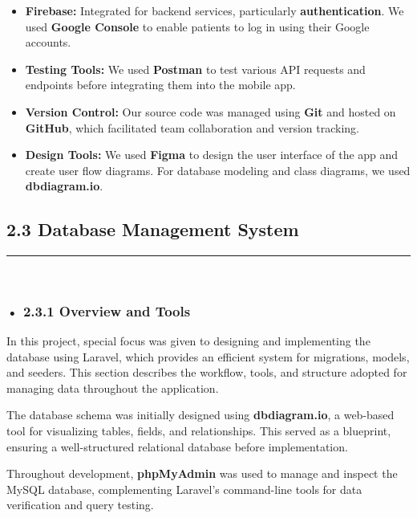 \documentclass[12pt]{report}
\begin{document}
\begin{itemize}
	\item \textbf{Firebase:} Integrated for backend services, particularly \textbf{authentication}. We used \textbf{Google Console} to enable patients to log in using their Google accounts.

	\item \textbf{Testing Tools:} We used \textbf{Postman} to test various API requests and endpoints before integrating them into the mobile app.

	\item \textbf{Version Control:} Our source code was managed using \textbf{Git} and hosted on \textbf{GitHub}, which facilitated team collaboration and version tracking.

	\item \textbf{Design Tools:} We used \textbf{Figma} to design the user interface of the app and create user flow diagrams. For database modeling and class diagrams, we used \textbf{dbdiagram.io}.

\end{itemize}

\subsection*{2.3 Database Management System}
\rule{0.40\linewidth}{0.5pt} \\[-1.0cm]
\subsubsection*{• 2.3.1 Overview and Tools}
In this project, special focus was given to designing and implementing the database using Laravel, which provides an efficient system for migrations, models, and seeders. This section describes the workflow, tools, and structure adopted for managing data throughout the application.

\noindent The database schema was initially designed using \textbf{dbdiagram.io}, a web-based tool for visualizing tables, fields, and relationships. This served as a blueprint, ensuring a well-structured relational database before implementation.

\noindent Throughout development, \textbf{phpMyAdmin} was used to manage and inspect the MySQL database, complementing Laravel’s command-line tools for data verification and query testing.

\vspace{0.5cm}
\end{document}
